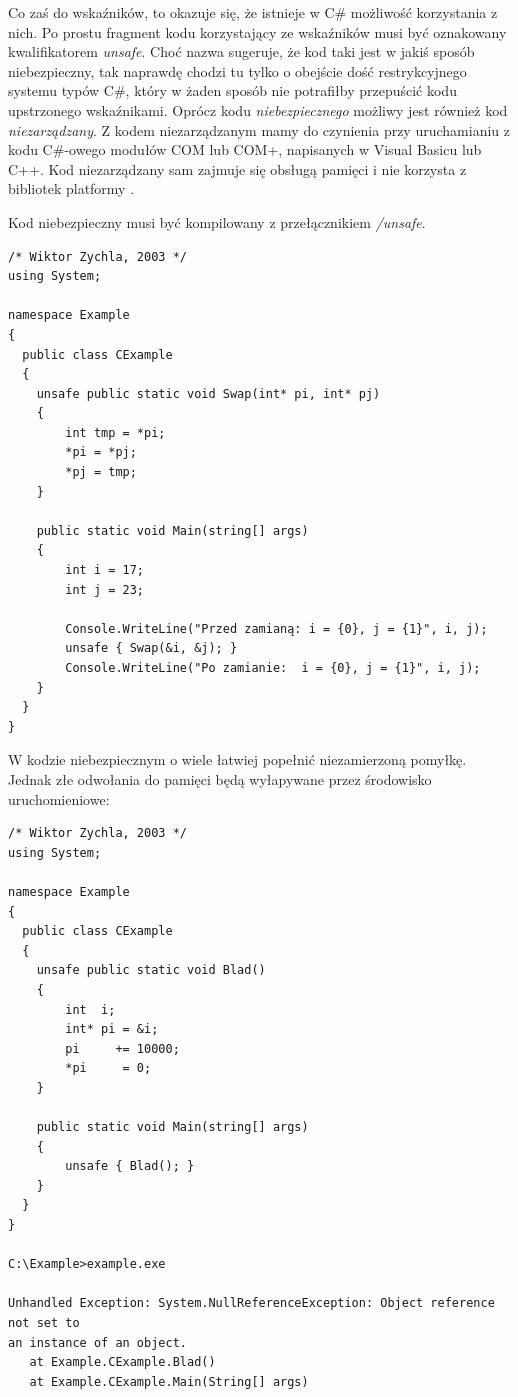 Co zaś do wskaźników, to okazuje się, że istnieje w C\# możliwość korzystania z nich. Po prostu fragment kodu
korzystający ze wskaźników musi być oznakowany kwalifikatorem {\em unsafe}. Choć nazwa sugeruje, że kod
taki jest w jakiś sposób niebezpieczny, tak naprawdę chodzi tu tylko o obejście dość restrykcyjnego
systemu typów C\#, który w żaden sposób nie potrafiłby przepuścić kodu upstrzonego wskaźnikami. Oprócz kodu
{\em niebezpiecznego} możliwy jest również kod {\em niezarządzany}. Z kodem niezarządzanym mamy do czynienia
przy uruchamianiu z kodu C\#-owego modułów COM lub COM+, napisanych w Visual Basicu lub C++. Kod
niezarządzany sam zajmuje się obsługą pamięci i nie korzysta z bibliotek platformy \NET{}.

Kod niebezpieczny musi być kompilowany z przełącznikiem {\em /unsafe}.

\begin{scriptsize}
\begin{verbatim}
/* Wiktor Zychla, 2003 */
using System;

namespace Example
{
  public class CExample
  {
    unsafe public static void Swap(int* pi, int* pj)
    {
        int tmp = *pi;
        *pi = *pj;
        *pj = tmp;
    }

    public static void Main(string[] args)
    {
        int i = 17;
        int j = 23;

        Console.WriteLine("Przed zamianą: i = {0}, j = {1}", i, j);
        unsafe { Swap(&i, &j); }
        Console.WriteLine("Po zamianie:  i = {0}, j = {1}", i, j);
    }
  }
}
\end{verbatim}
\end{scriptsize}

W kodzie niebezpiecznym o wiele łatwiej popełnić niezamierzoną pomyłkę. Jednak złe odwołania 
do pamięci będą wyłapywane przez środowisko uruchomieniowe:

\begin{scriptsize}
\begin{verbatim}
/* Wiktor Zychla, 2003 */
using System;

namespace Example
{
  public class CExample
  {
    unsafe public static void Blad()
    {
        int  i;
        int* pi = &i;
        pi     += 10000;
        *pi     = 0;
    }

    public static void Main(string[] args)
    {
        unsafe { Blad(); }
    }
  }
}

C:\Example>example.exe

Unhandled Exception: System.NullReferenceException: Object reference not set to
an instance of an object.
   at Example.CExample.Blad()
   at Example.CExample.Main(String[] args)
\end{verbatim}
\end{scriptsize}


